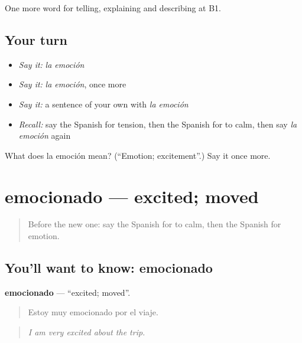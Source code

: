 \begin{grammarlens}[title={What you've built}]
One more word for telling, explaining and describing at B1.
\end{grammarlens}

\subsection*{Your turn}
\begin{itemize}
\raggedright
  \item \emph{Say it:} \emph{la emoción}
  \item \emph{Say it:} \emph{la emoción}, once more
  \item \emph{Say it:} a sentence of your own with \emph{la emoción}
  \item \emph{Recall:} say the Spanish for tension, then the Spanish for to calm, then say \emph{la emoción} again
\end{itemize}

\begin{tcolorbox}[breakable,colback=teal!4,colframe=teal!35!black,title={Before you move on}]
What does la emoción mean? (\textquotedblleft{}Emotion; excitement\textquotedblright{}.) Say it once more.
\end{tcolorbox}
\section[emocionado]{emocionado — excited; moved}

\label{lesson:ES-C711-emocionado}



\begin{quote}
Before the new one: say the Spanish for to calm, then the Spanish for emotion.
\end{quote}

\subsection*{You'll want to know: emocionado}
\textbf{emocionado} — \textquotedblleft{}excited; moved\textquotedblright{}.

\begin{quote}
Estoy muy emocionado por el viaje.
\end{quote}

\begin{quote}
\emph{I am very excited about the trip.}
\end{quote}

